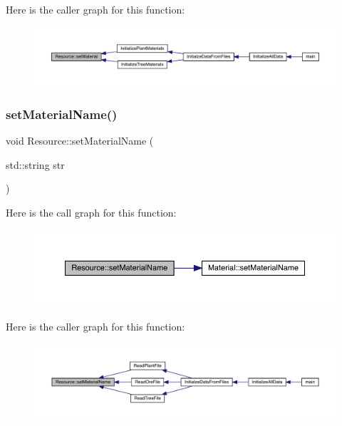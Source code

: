 Here is the caller graph for this function\+:
\nopagebreak
\begin{figure}[H]
\begin{center}
\leavevmode
\includegraphics[width=350pt]{df/d00/class_resource_a84958f14311775c18c24cb69d43a74d0_icgraph}
\end{center}
\end{figure}
\mbox{\label{class_resource_a43801faadac24460d3266d5cbc2940f9}} 
\subsubsection{\texorpdfstring{set\+Material\+Name()}{setMaterialName()}}
{\footnotesize\ttfamily void Resource\+::set\+Material\+Name (\begin{DoxyParamCaption}\item[{std\+::string}]{str }\end{DoxyParamCaption})}

Here is the call graph for this function\+:
\nopagebreak
\begin{figure}[H]
\begin{center}
\leavevmode
\includegraphics[width=350pt]{df/d00/class_resource_a43801faadac24460d3266d5cbc2940f9_cgraph}
\end{center}
\end{figure}
Here is the caller graph for this function\+:
\nopagebreak
\begin{figure}[H]
\begin{center}
\leavevmode
\includegraphics[width=350pt]{df/d00/class_resource_a43801faadac24460d3266d5cbc2940f9_icgraph}
\end{center}
\end{figure}
\mbox{\label{class_resource_a644f765b367972686b6d0b9c7a0ce9dd}} 

